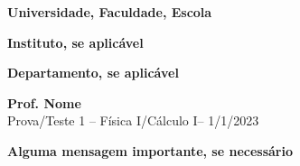 \documentclass[9pt,twocolumn,brazil]{article}
\begin{document}
\textbf{Universidade, Faculdade, Escola}

\textbf{Instituto, se aplicável}

\textbf{Departamento, se aplicável}

\textbf{Prof. Nome}\\

Prova/Teste 1 -- Física I/Cálculo I-- 1/1/2023\medskip{}

\textbf{Alguma mensagem importante, se necessário}\medskip{}
\end{document}
